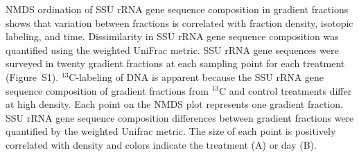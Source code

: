 NMDS ordination of SSU rRNA gene sequence composition in
gradient fractions shows that variation between fractions is
correlated with fraction density, isotopic labeling, and
time. Dissimilarity in SSU rRNA gene sequence composition was quantified using the 
weighted UniFrac metric. SSU rRNA gene sequences were surveyed in twenty
gradient fractions at each sampling point for each treatment (Figure~S1).
$^{13}$C-labeling of DNA is apparent because the SSU rRNA gene sequence composition of
gradient fractions from $^{13}$C and control treatments differ at high density.
Each point on the NMDS plot represents one gradient fraction.  SSU rRNA gene sequence
composition differences between gradient fractions were quantified by the
weighted Unifrac metric. The size of each point is positively correlated with
density and colors indicate the treatment (A) or day (B).
